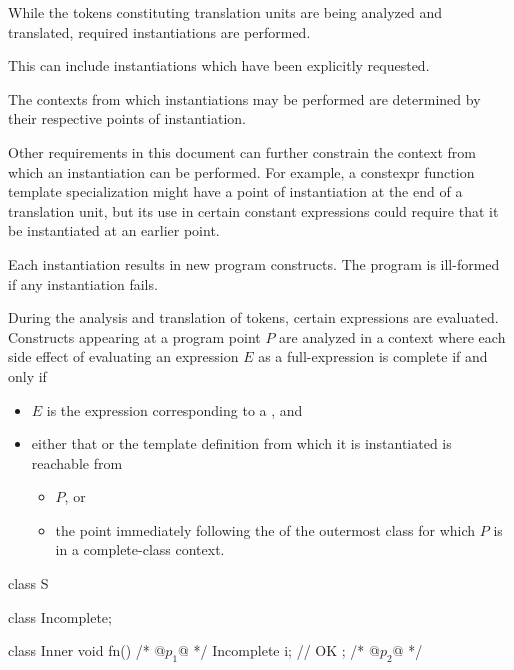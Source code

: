 \begin{enumerate}
While the tokens constituting translation units
are being analyzed and translated,
required instantiations are performed.
\begin{note}
This can include
instantiations which have been explicitly
requested.
\end{note}

The contexts from which instantiations may be performed
are determined by their respective points of instantiation.

\begin{note}
Other requirements in this document can further constrain
the context from which an instantiation can be performed.
For example, a constexpr function template specialization
might have a point of instantiation at the end of a translation unit,
but its use in certain constant expressions could require
that it be instantiated at an earlier point.
\end{note}

Each instantiation results in new program constructs.
The program is ill-formed if any instantiation fails.

During the analysis and translation of tokens,
certain expressions are evaluated.
Constructs appearing at a program point $P$ are analyzed
in a context where each side effect of evaluating an expression $E$
as a full-expression is complete if and only if
\begin{itemize}
\item
$E$ is the expression corresponding to
a , and
\item
either that  or
the template definition from which it is instantiated
is reachable from
\begin{itemize}
\item
$P$, or
\item
the point immediately following
the  of the outermost class
for which $P$ is in a complete-class context.
\end{itemize}
\end{itemize}
\begin{example}
\begin{codeblock}
class S {
  class Incomplete;

  class Inner {
    void fn() {
      /* @$p_1$@ */ Incomplete i;    // OK
    }
  }; /* @$p_2$@ */

}
\end{codeblock}
\end{example}
\end{enumerate}
